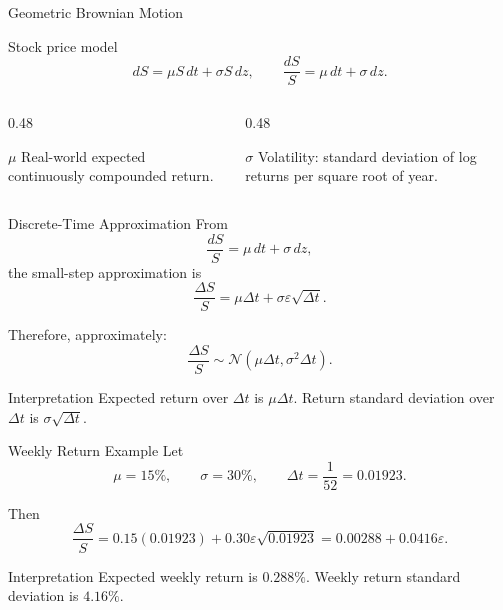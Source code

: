 \documentclass[aspectratio=169,11pt]{beamer}
\newcommand{\dt}{\Delta t}
\newcommand{\eps}{\varepsilon}
\newcommand{\Normal}{\mathcal{N}}
\begin{document}
\begin{frame}[label=gbm_main]{Geometric Brownian Motion}
    \begin{block}{Stock price model}
        \[
            dS=\mu S\,dt+\sigma S\,dz,
            \qquad
            \frac{dS}{S}=\mu\,dt+\sigma\,dz.
        \]
    \end{block}

    \begin{columns}[T]
        \begin{column}{0.48\textwidth}
            \begin{block}{\(\mu\)}
                Real-world expected continuously compounded return.
            \end{block}
        \end{column}
        \begin{column}{0.48\textwidth}
            \begin{block}{\(\sigma\)}
                Volatility: standard deviation of log returns per square root of year.
            \end{block}
        \end{column}
    \end{columns}

    \vspace{0.5em}
    \hyperlink{deriv_gbm_no_uncertainty}{}
\end{frame}

\begin{frame}{Discrete-Time Approximation}
    From
    \[
        \frac{dS}{S}=\mu\,dt+\sigma\,dz,
    \]
    the small-step approximation is
    \[
        \frac{\Delta S}{S}
        =
        \mu\dt+\sigma\eps\sqrt{\dt}.
    \]

    Therefore, approximately:
    \[
        \frac{\Delta S}{S}
        \sim
        \Normal(\mu\dt,\sigma^2\dt).
    \]

    \begin{block}{Interpretation}
        Expected return over \(\dt\) is \(\mu\dt\).
        Return standard deviation over \(\dt\) is \(\sigma\sqrt{\dt}\).
    \end{block}
\end{frame}

\begin{frame}{Weekly Return Example}
    Let
    \[
        \mu=15\%,
        \qquad
        \sigma=30\%,
        \qquad
        \dt=\frac{1}{52}=0.01923.
    \]

    Then
    \[
        \frac{\Delta S}{S}
        =
        0.15(0.01923)+0.30\eps\sqrt{0.01923}
        =
        0.00288+0.0416\eps.
    \]

    \begin{exampleblock}{Interpretation}
        Expected weekly return is \(0.288\%\).
        Weekly return standard deviation is \(4.16\%\).
    \end{exampleblock}
\end{frame}
\end{document}
